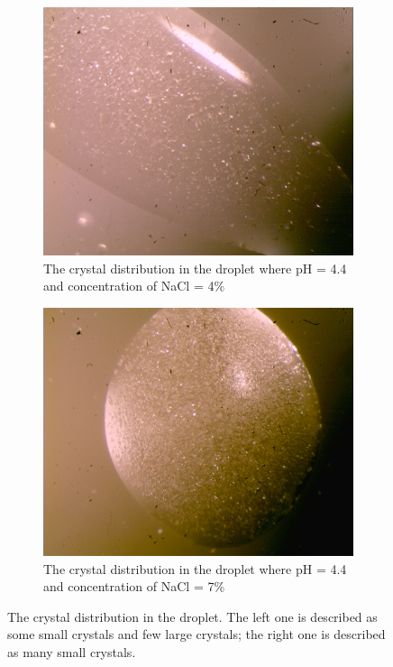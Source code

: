 \documentclass[a4paper,english,12pt,bibliography=totoc]{scrreprt}
\begin{document}
\begin{figure}[H]

    \begin{subfigure}{0.45\textwidth}
        \centering
        \includegraphics[width=\textwidth]{2. First draft of protein crystalization/Images/Image-6_2000-01-21.jpg}
        \caption{The crystal distribution in the droplet where pH = 4.4 and concentration of NaCl = 4\%}
        \label{fig:pH4.4,4ptg}
    \end{subfigure}
    \begin{subfigure}{0.45\textwidth}
        \centering
        \includegraphics[width=\textwidth]{2. First draft of protein crystalization/Images/Image-9_2000-01-21.jpg}
        \caption{The crystal distribution in the droplet where pH = 4.4 and concentration of NaCl = 7\%}
        \label{fig:pH4.4,7ptg}
    \end{subfigure}
    \caption{The crystal distribution in the droplet. The left one is described as some small crystals and few large crystals; the right one is described as many small crystals. }
    \label{fig:ym_cp_curve}
    
\end{figure}
\end{document}
